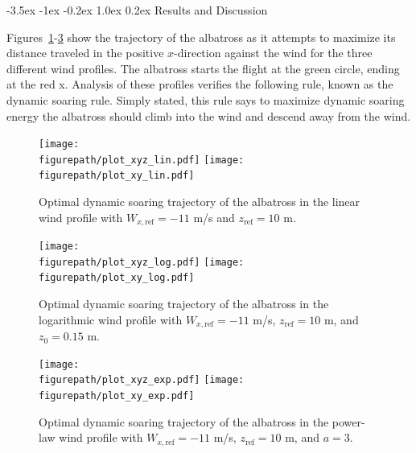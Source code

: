 \documentclass[11pt,letterpaper,onecolumn]{article}
\makeatletter
\newcommand{\figurepath}{../fig/term-project}
\renewcommand\section{\@startsection{section}{1}{\z@}%
{-3.5ex \@plus-1ex \@minus-0.2ex}%
{1.0ex \@plus0.2ex}%
{\fontsize{12pt}{12pt}\selectfont\bfseries\sffamily}}
\makeatother
\begin{document}
  \section{Results and Discussion}\label{sec.results}

  Figures~\ref{fig.xyzplot_lin}-\ref{fig.xyzplot_exp} show the trajectory of the albatross as it attempts to maximize its distance traveled in the positive $x$-direction against the wind for the three different wind profiles.
  The albatross starts the flight at the green circle, ending at the red x.
  Analysis of these profiles verifies the following rule, known as the dynamic soaring rule.
  Simply stated, this rule says to maximize dynamic soaring energy the albatross should climb into the wind and descend away from the wind.

  \begin{figure}[H]
    \begin{center}
      \texttt{[image: \\figurepath/plot\_xyz\_lin.pdf]}
      \texttt{[image: \\figurepath/plot\_xy\_lin.pdf]}
      \caption{Optimal dynamic soaring trajectory of the albatross in the linear wind profile with $W_{x,\text{ref}}=-11$ m/s and $z_{\text{ref}}=10$ m.\label{fig.xyzplot_lin}}
    \end{center}
  \end{figure}

  \begin{figure}[H]
    \begin{center}
      \texttt{[image: \\figurepath/plot\_xyz\_log.pdf]}
      \texttt{[image: \\figurepath/plot\_xy\_log.pdf]}
      \caption{Optimal dynamic soaring trajectory of the albatross in the logarithmic wind profile with $W_{x,\text{ref}}=-11$ m/s, $z_{\text{ref}}=10$ m, and $z_{0}=0.15$ m.\label{fig.xyzplot_log}}
    \end{center}
  \end{figure}

  \begin{figure}[H]
    \begin{center}
      \texttt{[image: \\figurepath/plot\_xyz\_exp.pdf]}
      \texttt{[image: \\figurepath/plot\_xy\_exp.pdf]}
      \caption{Optimal dynamic soaring trajectory of the albatross in the power-law wind profile with $W_{x,\text{ref}}=-11$ m/s, $z_{\text{ref}}=10$ m, and $a=3$.\label{fig.xyzplot_exp}}
    \end{center}
  \end{figure}
\end{document}
